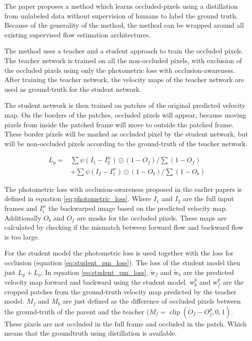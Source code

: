 The paper \cite{liu_ddflow_2019} proposes a method which learns occluded-pixels using a distillation from unlabeled data without supervision of humans to label the ground truth. Because of the generality of the method, the method can be wrapped around all existing supervised flow estimation architectures.

The method uses a teacher and a student approach to train the occluded pixels. The teacher network is trained on all the non-occluded pixels, with exclusion of the occluded pixels using only the photometric loss with occlusion-awareness. After training the teacher network, the velocity maps of the teacher network are used as ground-truth for the student network.

The student network is then trained on patches of the original predicted velocity map. On the borders of the patches, occluded pixels will appear, because moving pixels from inside the patched frame will move to outside the patched frame. These border pixels will be marked as occluded pixel by the student network, but will be non-occluded pixels according to the ground-truth of the teacher network.

\begin{equation}
\begin{aligned}
L_{p}=& \sum \psi\left(I_{1}-I_{2}^{w}\right) \odot\left(1-O_{f}\right) / \sum\left(1-O_{f}\right) \\
&+\sum \psi\left(I_{2}-I_{1}^{w}\right) \odot\left(1-O_{b}\right) / \sum\left(1-O_{b}\right)
\end{aligned}
\label{eq:photometric_loss}
\end{equation}

The photometric loss \cite{Yu2016} with occlusion-awareness \cite{Janai2018} proposed in the earlier papers is defined in equation \ref{eq:photometric_loss}. Where $I_1$ and $I_2$ are the full input frames and $I_i^w$ the backwarped image based on the predicted velocity map. Additionally $O_b$ and $O_f$ are masks for the occluded pixels. These maps are calculated by checking if the mismatch between forward flow and backward flow is too large.

For the student model the photometric loss is used together with the loss for occlusion (equation \ref{eq:student_pm_loss}). The loss of the student model then just $L_p+L_o$. In equation \ref{eq:student_pm_loss}, $\widetilde{\mathrm{w}}_{f}$ and $\widetilde{\mathrm{w}}_{b}$ are the predicted velocity map forward and backward using the student model. $\mathrm{w}_{b}^{p}$ and $\mathrm{w}_{f}^{p}$ are the cropped patches from the ground-truth velocity map predicted by the teacher model. $M_f$ and $M_b$ are just defined as the difference of occluded pixels between the ground-truth of the parent and the teacher ($M_{f}=\operatorname{clip}\left(\widetilde{O}_{f}-O_{f}^{p}, 0,1\right)$. These pixels are not occluded in the full frame and occluded in the patch. Which means that the groundtruth using distillation is available.


